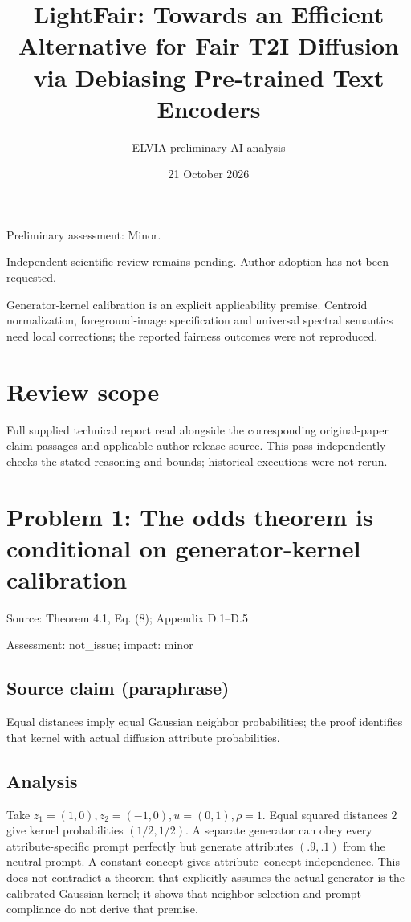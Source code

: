 \documentclass[11pt]{article}
\begin{document}
\title{LightFair: Towards an Efficient Alternative for Fair T2I Diffusion via Debiasing Pre-trained Text Encoders}

\author{ELVIA preliminary AI analysis}\date{21 October 2026}\maketitle

Preliminary assessment: Minor.\par

Independent scientific review remains pending. Author adoption has not been requested.

Generator-kernel calibration is an explicit applicability premise. Centroid normalization, foreground-image specification and universal spectral semantics need local corrections; the reported fairness outcomes were not reproduced.

\section*{Review scope}

Full supplied technical report read alongside the corresponding original-paper claim passages and applicable author-release source. This pass independently checks the stated reasoning and bounds; historical executions were not rerun.

\section*{Problem 1: The odds theorem is conditional on generator-kernel calibration}

Source: Theorem 4.1, Eq. (8); Appendix D.1–D.5

Assessment: not\_issue; impact: minor

\subsection*{Source claim (paraphrase)}

Equal distances imply equal Gaussian neighbor probabilities; the proof identifies that kernel with actual diffusion attribute probabilities.

\subsection*{Analysis}

Take \(z_1=(1,0),z_2=(-1,0),u=(0,1),\rho=1\). Equal squared distances \(2\) give kernel probabilities \((1/2,1/2)\). A separate generator can obey every attribute-specific prompt perfectly but generate attributes \((.9,.1)\) from the neutral prompt. A constant concept gives attribute–concept independence. This does not contradict a theorem that explicitly assumes the actual generator is the calibrated Gaussian kernel; it shows that neighbor selection and prompt compliance do not derive that premise.
\end{document}
